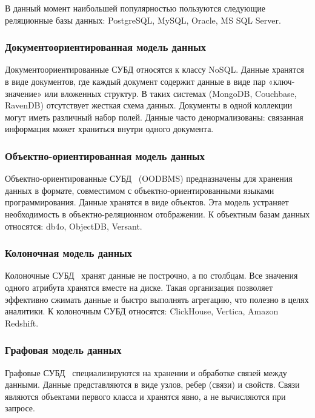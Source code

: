 В данный момент наибольшей популярностью пользуются следующие реляционные базы данных: PostgreSQL, MySQL, Oracle, MS SQL Server.

\subsubsection{Документоориентированная модель данных}
Документоориентированные СУБД относятся к классу NoSQL.
Данные хранятся в виде документов, где каждый документ содержит данные в виде пар «ключ-значение» или вложенных структур.
В таких системах (MongoDB, Couchbase, RavenDB) отсутствует жесткая схема данных.
Документы в одной коллекции могут иметь различный набор полей.
Данные часто денормализованы: связанная информация может храниться внутри одного документа.

\subsubsection{Объектно-ориентированная модель данных}
Объектно-ориентированные СУБД~\cite{oop-db} (OODBMS) предназначены для хранения данных в формате, совместимом с объектно-ориентированными языками программирования.
Данные хранятся в виде объектов. Эта модель устраняет необходимость в объектно-реляционном отображении.
К объектным базам данных относятся: db4o, ObjectDB, Versant.

\subsubsection{Колоночная модель данных}
Колоночные СУБД~\cite{column-db} хранят данные не построчно, а по столбцам.
Все значения одного атрибута хранятся вместе на диске. 
Такая организация позволяет эффективно сжимать данные и быстро выполнять агрегацию, 
что полезно в целях аналитики. 
К колоночным СУБД относятся: ClickHouse, Vertica, Amazon Redshift.

\subsubsection{Графовая модель данных}
Графовые СУБД~\cite{graph-db} специализируются на хранении и обработке связей между данными.
Данные представляются в виде узлов, ребер (связи) и свойств.
Связи являются объектами первого класса и хранятся явно, а не вычисляются при запросе.